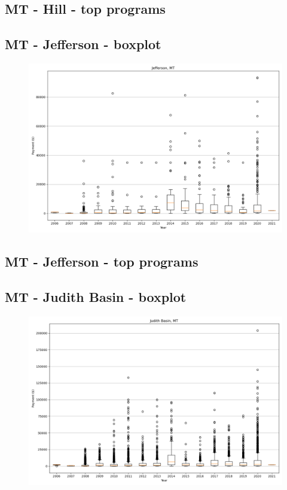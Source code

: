\subsection*{MT - Hill - top programs}

\newpage
\subsection*{MT - Jefferson - boxplot}
\begin{figure}[h]
\centering
\includegraphics[width=7in]{../output/boxplots/counties/Jefferson-MT_boxplot.png}
\end{figure}


\subsection*{MT - Jefferson - top programs}

\newpage
\subsection*{MT - Judith Basin - boxplot}
\begin{figure}[h]
\centering
\includegraphics[width=7in]{../output/boxplots/counties/Judith Basin-MT_boxplot.png}
\end{figure}


